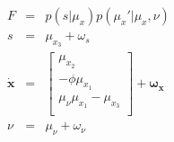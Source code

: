 \documentclass[a4paper]{report}
\begin{document}
\begin{eqnarray}
  F&=&p(s|\mu_x)p(\mu_x'|\mu_x,\nu)\nonumber\\
  s &=& \mu_{x_3} + \omega_s \nonumber \\
  \dot{\mathbf{x}} &=&
  \left[\begin{array}{c}
  \mu_{x_2} \\
  -\phi\mu_{x_1} \\
  \mu_{\nu}\mu_{x_1} - \mu_{x_3} \\
  \end{array}\right] +\boldsymbol{\omega_x}\nonumber \\
  \nu &=& \mu_{\nu} + \omega_{\nu} \nonumber
\end{eqnarray}
\end{document}
